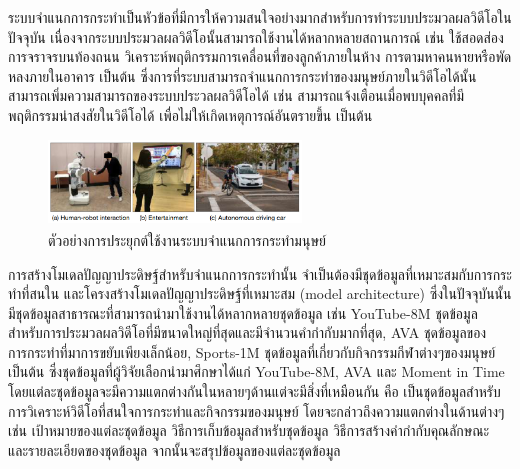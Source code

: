 ระบบจำแนกการกระทำเป็นหัวข้อที่มีการให้ความสนใจอย่างมากสำหรับการทำระบบประมวลผลวิดีโอในปัจจุบัน เนื่องจากระบบประมวลผลวิดีโอนั้นสามารถใช้งานได้หลากหลายสถานการณ์ เช่น ใช้สอดส่องการจราจรบนท้องถนน
วิเคราะห์พฤติกรรมการเคลื่อนที่ของลูกค้าภายในห้าง การตามหาคนหายหรือพัดหลงภายในอาคาร เป็นต้น ซึ่งการที่ระบบสามารถจำแนกการกระทำของมนุษย์ภายในวิดีโอได้นั้นสามารถเพิ่มความสามารถของระบบประวลผลวิดีโอได้
เช่น สามารถแจ้งเตือนเมื่อพบบุคคลที่มีพฤติกรรมน่าสงสัยในวิดีโอได้ เพื่อไม่ให้เกิดเหตุการณ์อันตรายขึ้น เป็นต้น

\begin{figure}[!ht]
	\centering
	\includegraphics[width=0.6\textwidth]{chapter2/images/video_analytics_ex.png}
	\caption{ตัวอย่างการประยุกต์ใช้งานระบบจำแนกการกระทำมนุษย์\textsuperscript{\cite{kong2018human}}}
	\label{fig:actioncls_ex}
\end{figure}

การสร้างโมเดลปัญญาประดิษฐ์สำหรับจำแนกการกระทำนั้น จำเป็นต้องมีชุดข้อมูลที่เหมาะสมกับการกระทำที่สนใน และโครงสร้างโมเดลปัญญาประดิษฐ์ที่เหมาะสม (model architecture) 
ซึ่งในปัจจุบันนั้นมีชุดข้อมูลสาธารณะที่สามารถนำมาใช้งานได้หลากหลายชุดข้อมูล เช่น YouTube-8M ชุดข้อมูลสำหรับการประมวลผลวิดีโอที่มีขนาดใหญ่ที่สุดและมีจำนวนคำกำกับมากที่สุด, 
AVA ชุดข้อมูลของการกระทำที่มาการขยับเพียงเล็กน้อย, Sports-1M ชุดข้อมูลที่เกี่ยวกับกิจกรรมกีฬาต่างๆของมนุษย์ เป็นต้น ซึ่งชุดข้อมูลที่ผู้วิจัยเลือกนำมาศึกษาได้แก่ YouTube-8M, AVA และ Moment in Time
โดยแต่ละชุดข้อมูลจะมีความแตกต่างกันในหลายๆด้านแต่จะมีสิ่งที่เหมือนกัน คือ เป็นชุดข้อมูลสำหรับการวิเคราะห์วิดีโอที่สนใจการกระทำและกิจกรรมของมนุษย์ โดยจะกล่าวถึงความแตกต่างในด้านต่างๆ 
เช่น เป้าหมายของแต่ละชุดข้อมูล วิธีการเก็บข้อมูลสำหรับชุดข้อมูล วิธีการสร้างคำกำกับคุณลักษณะ และรายละเอียดของชุดข้อมูล จากนั้นจะสรุปข้อมูลของแต่ละชุดข้อมูล